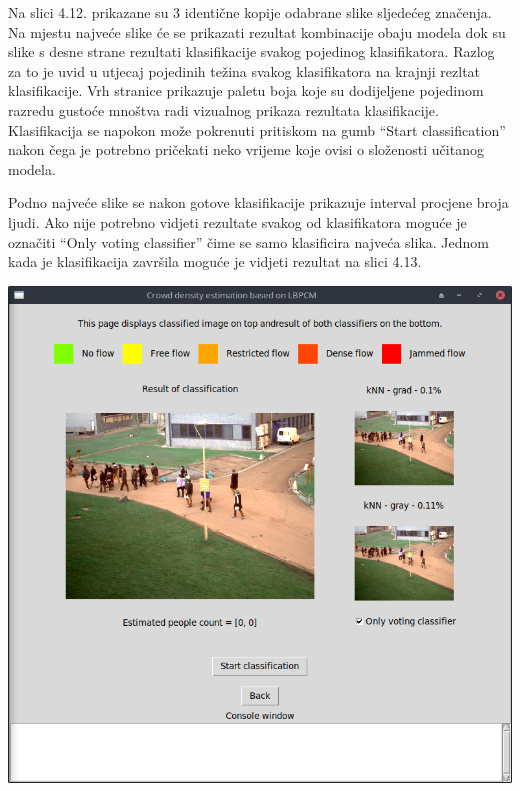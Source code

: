 \documentclass[times, utf8, zavrsni]{fer}
\begin{document}
\bigbreak

Na slici 4.12. prikazane su 3 identične kopije odabrane slike sljedećeg 
značenja. Na mjestu najveće slike će se prikazati rezultat kombinacije 
obaju modela dok su slike s desne strane rezultati klasifikacije svakog 
pojedinog klasifikatora. 
Razlog za to je uvid u utjecaj pojedinih težina svakog klasifikatora na 
krajnji rezltat klasifikacije. Vrh stranice prikazuje paletu boja koje
su dodijeljene pojedinom razredu gustoće mnoštva radi vizualnog
prikaza rezultata klasifikacije. Klasifikacija se napokon može pokrenuti
pritiskom na gumb \enquote{Start classification} nakon čega je potrebno
pričekati neko vrijeme koje ovisi o složenosti učitanog modela. 

\bigbreak

Podno najveće slike se nakon gotove klasifikacije prikazuje interval
procjene broja ljudi. Ako nije potrebno vidjeti rezultate svakog od
klasifikatora moguće je označiti  \enquote{Only voting classifier}
čime se samo klasificira najveća slika. Jednom kada je klasifikacija 
završila moguće je vidjeti rezultat na slici 4.13.

\bigbreak

\begin{minipage}{\linewidth}
\centering
\includegraphics[scale=0.38]{img/cl3.png}
\end{minipage}
\end{document}
